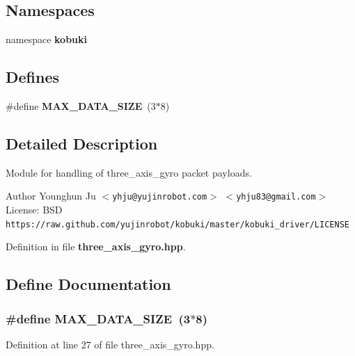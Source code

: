 \subsection*{\-Namespaces}
\begin{DoxyCompactItemize}
\item 
namespace {\bf kobuki}
\end{DoxyCompactItemize}
\subsection*{\-Defines}
\begin{DoxyCompactItemize}
\item 
\#define {\bf \-M\-A\-X\-\_\-\-D\-A\-T\-A\-\_\-\-S\-I\-Z\-E}~(3$\ast$8)
\end{DoxyCompactItemize}


\subsection{\-Detailed \-Description}
\-Module for handling of three\-\_\-axis\-\_\-gyro packet payloads. \begin{DoxyAuthor}{\-Author}
\-Younghun \-Ju $<${\tt yhju@yujinrobot.\-com}$>$ $<${\tt yhju83@gmail.\-com}$>$ \-License\-: \-B\-S\-D {\tt https\-://raw.\-github.\-com/yujinrobot/kobuki/master/kobuki\-\_\-driver/\-L\-I\-C\-E\-N\-S\-E} 
\end{DoxyAuthor}


\-Definition in file {\bf three\-\_\-axis\-\_\-gyro.\-hpp}.



\subsection{\-Define \-Documentation}
\subsubsection[{\-M\-A\-X\-\_\-\-D\-A\-T\-A\-\_\-\-S\-I\-Z\-E}]{\setlength{\rightskip}{0pt plus 5cm}\#define {\bf \-M\-A\-X\-\_\-\-D\-A\-T\-A\-\_\-\-S\-I\-Z\-E}~(3$\ast$8)}\label{three__axis__gyro_8hpp_a87f68e96fb938eddc39ad1f19d923a96}


\-Definition at line 27 of file three\-\_\-axis\-\_\-gyro.\-hpp.

